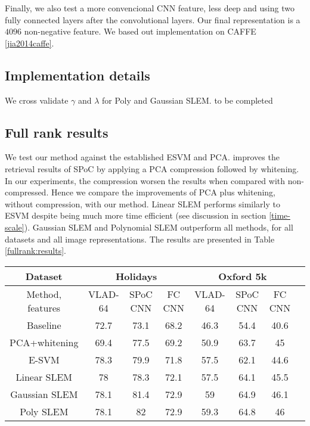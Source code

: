 Finally, we also test a more convencional CNN feature, less deep and using two fully connected layers after the convolutional layers. 
Our final representation is a $4096$ non-negative feature. We based out implementation on CAFFE \ref{jia2014caffe}.


\subsection{Implementation details}
We cross validate $\gamma$ and $\lambda$ for Poly and Gaussian SLEM. to be completed


\subsection{Full rank results}

We test our method against the established ESVM and PCA. 
\cite{babenko15} improves the retrieval results of SPoC by applying a PCA compression followed by whitening. In our experiments, the compression worsen the results when compared with non-compressed.
Hence we compare the improvements of PCA plus whitening, without compression, with our method.
Linear SLEM performs similarly to ESVM despite being much more time efficient (see discussion in section \ref{time-scale}). 
Gaussian SLEM and Polynomial SLEM outperform all methods, for all datasets and all image representations. 
The results are presented in Table \ref{fullrank:results}.

\begin{table*}[t]
\begin{center}
\caption{Mean average precision results for INRIA Holidays and Oxford buildings datasets, expressed as percentages. In this table, we present our results for VLAD-64 \ref{VLAD}, sum-pooling of convolutional features (SPoC) \ref{babenko15} and fully connected (fc) CNN \ref{jia2014caffe}}
\begin{tabular}{|c|c|c|c|c|c|c|c|}
\hline
Dataset & \multicolumn{3}{|c|}{\textbf{Holidays}} & \multicolumn{3}{|c|}{\textbf{Oxford 5k}}\\
\hline
Method, features & VLAD-64  & SPoC CNN & FC CNN & VLAD-64 & SPoC CNN & FC CNN\\
\hline\hline
Baseline            & 72.7 & 73.1 & 68.2  & 46.3 & 54.4 & 40.6\\
PCA+whitening       & 69.4 & 77.5 & 69.2 & 50.9  & 63.7 & 45 \\
E-SVM               & 78.3 & 79.9 & 71.8 & 57.5  & 62.1 & 44.6\\
Linear SLEM         & 78   & 78.3 & 72.1 & 57.5  & 64.1 & 45.5\\
Gaussian SLEM       & 78.1 & 81.4 & 72.9 & 59    & 64.9 & 46.1\\
Poly SLEM           & 78.1 &  82  & 72.9 & 59.3  & 64.8 & 46\\
\hline
\end{tabular}
\end{center}
\label{fullrank:results}
\end{table*}

